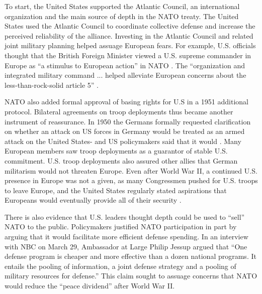 \documentclass[12pt]{article}
\begin{document}
To start, the United States supported the Atlantic Council, an international organization and the main source of depth in the NATO treaty. 
The United States used the Atlantic Council to coordinate collective defense and increase the perceived reliability of the alliance. 
Investing in the Atlantic Council and related joint military planning helped assuage European fears. 
For example, U.S. officials thought that the British Foreign Minister viewed a U.S. supreme commander in Europe as ``a stimulus to European action'' in NATO \citep{Acheson1950}. 
The ``organization and integrated military command ... helped alleviate European concerns about the less-than-rock-solid article 5'' \citep[pg. 26]{Sayle2019}.


NATO also added formal approval of basing rights for U.S in a 1951 additional protocol.  
Bilateral agreements on troop deployments thus became another instrument of reassurance. 
In 1950 the Germans formally requested clarification on whether an attack on US forces in Germany would be treated as an armed attack on the United States- and US policymakers said that it would \citep[pg. 395]{Acheson1969}.  
Many European members saw troop deployments as a guarantor of stable U.S. commitment. 
U.S. troop deployments also assured other allies that German militarism would not threaten Europe. 
Even after World War II, a continued U.S. presence in Europe was not a given, as many Congressmen pushed for U.S. troops to leave Europe, and the United States regularly stated aspirations that Europeans would eventually provide all of their security \citep[pg. 20]{Sayle2019}. 


There is also evidence that U.S. leaders thought depth could be used to ``sell'' NATO to the public. 
Policymakers justified NATO participation in part by arguing that it would facilitate more efficient defense spending. 
In an interview with NBC on March 29, Ambassador at Large Philip Jessup argued that ``One defense program is cheaper and more effective than a dozen national programs. It entails the pooling of information, a joint defense strategy and a pooling of military resources for defense.''
This claim sought to assuage concerns that NATO would reduce the ``peace dividend'' after World War II. 


\end{document}
